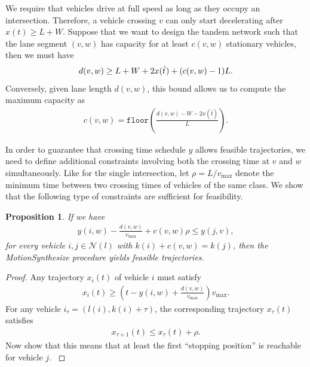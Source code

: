 \documentclass{article}
\theoremstyle{definition}
\theoremstyle{plain}
\newtheorem{proposition}{Proposition}
\begin{document}
We require that vehicles drive at full speed as long as they occupy an intersection. Therefore, a vehicle crossing $v$ can only start decelerating after $x(t) \geq L + W$.
%
Suppose that we want to design the tandem network such that the lane segment
$(v, w)$ has capacity for at least $c(v, w)$ stationary vehicles, then we must have
\begin{align*}
  d(v,w) \geq L + W + 2 x(\hat{t} \hspace{0.06em}) + (c(v, w) - 1) L.
\end{align*}
Conversely, given lane length $d(v,w)$, this bound allows us to compute the
maximum capacity as
\begin{align}\label{eq:max_capacity}
  c(v, w) = \texttt{floor}\left( \frac{d(v,w) - W - 2x(\hat{t})}{L} \right) .
\end{align}

In order to guarantee that crossing time schedule $y$ allows feasible
trajectories, we need to define additional constraints involving both the
crossing time at $v$ and $w$ simultaneously. Like for the single intersection,
let $\rho = L / v_{\max}$ denote the minimum time between two crossing times of
vehicles of the same class. We show that the following type of constraints are
sufficient for feasibility.

\begin{proposition}\label{prop:buffer_constraint}
  If we have
  \begin{align}
  y(i, w) - \frac{d(v,w)}{v_{\max}} + c(v,w) \rho \leq y(j, v) ,
  \end{align}
  for every vehicle $i, j \in \mathcal{N}(l)$ with $k(i) + c(v,w) = k(j)$, then the
  MotionSynthesize procedure yields feasible trajectories.
\end{proposition}
\begin{proof}
{\color{gray}
  Any trajectory $x_{i}(t)$ of vehicle $i$ must satisfy
  \begin{align*}
    x_{i}(t) \geq \left(t - y(i, w) + \frac{d(v,w)}{v_{\max}}\right) v_{\max} .
  \end{align*}
  For any vehicle $i_{\tau} = (l(i), k(i) + \tau)$, the corresponding trajectory
  $x_{\tau}(t)$ satisfies
  \begin{align*}
    x_{\tau + 1}(t) \leq x_{\tau}(t) + \rho .
  \end{align*}
  Now show that this means that at least the first ``stopping position'' is
  reachable for vehicle $j$.
}
\end{proof}
\end{document}
